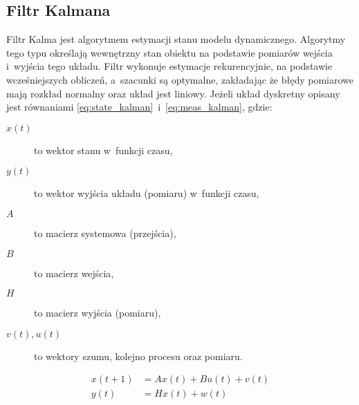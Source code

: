 \subsection{Filtr Kalmana}
Filtr Kalma jest algorytmem estymacji stanu modelu dynamicznego.
Algorytmy tego typu określają wewnętrzny stan obiektu na podstawie pomiarów
wejścia i~wyjścia tego układu.
Filtr wykonuje estymacje rekurencyjnie, na podstawie wcześniejszych obliczeń,
a~szacunki są optymalne, zakładając że błędy pomiarowe mają rozkład
normalny oraz układ jest liniowy.
Jeżeli układ dyskretny opisany jest równaniami
\ref{eq:state_kalman}~i~\ref{eq:meas_kalman}, gdzie:
\begin{description}
	\item[$x\left(t\right)$] to wektor stanu w~funkcji czasu,
	\item[$y\left(t\right)$] to wektor wyjścia układu (pomiaru) w~funkcji czasu,
	\item[$A$] to macierz systemowa (przejścia),
	\item[$B$] to macierz wejścia,
	\item[$H$] to macierz wyjścia (pomiaru),
	\item[$v\left(t\right), u\left(t\right)$] to wektory szumu, kolejno
		procesu oraz pomiaru.	
\end{description}
\begin{align}
x\left(t + 1\right) &= Ax\left(t\right) + Bu\left(t\right) + v\left(t\right)
\label{eq:state_kalman} \\
y\left(t\right) &= Hx\left(t\right) + w\left(t\right)
\label{eq:meas_kalman}
\end{align}

